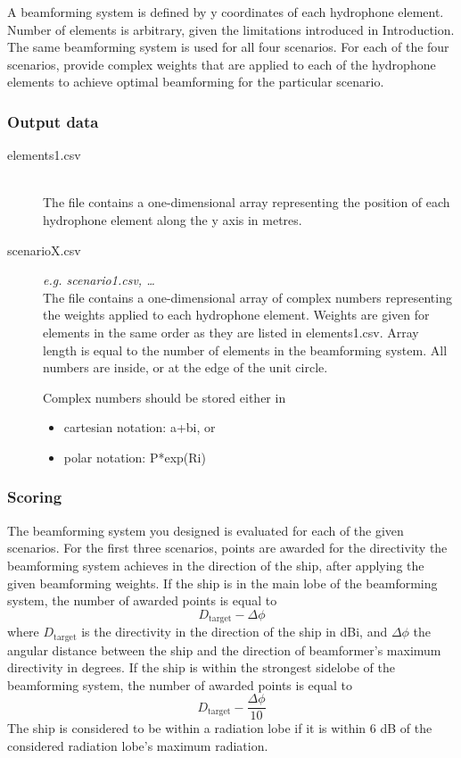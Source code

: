 \documentclass[openany]{book}
\begin{document}
	A beamforming system is defined by y coordinates of each hydrophone 
	element. 
	Number of elements is arbitrary, given the limitations introduced in 
	Introduction. The same beamforming system is used for all four scenarios. 
	For 
	each of the four scenarios, provide complex weights that are applied to 
	each of 
	the hydrophone elements to achieve optimal beamforming for the particular 
	scenario.
	
	\subsubsection*{Output data}
	
	\begin{description}
		\item[elements1.csv] \,\\ The file contains a one-dimensional array 
		representing the position of each hydrophone element along the y axis 
		in 
		metres.
		
		\item[scenarioX.csv] \textit{e.g. scenario1.csv, \ldots}\,\\ The file 
		contains a one-dimensional array of complex numbers representing the 
		weights applied to each hydrophone element. Weights are given for 
		elements 
		in the same order as they are listed in \textsf{elements1.csv}. Array 
		length is equal to the number of elements in the beamforming system. 
		All 
		numbers are inside, or at the edge of the unit circle.
		
		Complex numbers should be stored either in
		\begin{itemize}
			\item cartesian notation: \textsf{a+bi}, or
			\item polar notation: \textsf{P*exp(Ri)}
		\end{itemize}
	\end{description}
	
	
	\subsubsection*{Scoring}
	
	The beamforming system you designed is evaluated for each of the given 
	scenarios. For the first three scenarios, points are awarded for the 
	directivity the beamforming system achieves in the direction of the ship, 
	after 
	applying the given beamforming weights. If the ship is in the main lobe of 
	the 
	beamforming system, the number of awarded points is equal to
	\[ D_\textrm{target} - \varDelta \phi \]
	where $D_\textrm{target}$ is the directivity in the direction of the ship 
	in 
	dBi, and $\varDelta \phi$ the angular distance between the ship and the 
	direction of beamformer's maximum directivity in degrees. If the ship is 
	within 
	the strongest sidelobe of the beamforming system, the number of awarded 
	points 
	is equal to
	\[ D_\textrm{target} - \dfrac{\varDelta \phi}{10} \]
	The ship is considered to be within a radiation lobe if it is within 6 dB 
	of 
	the considered radiation lobe's maximum radiation.
	
\end{document}
